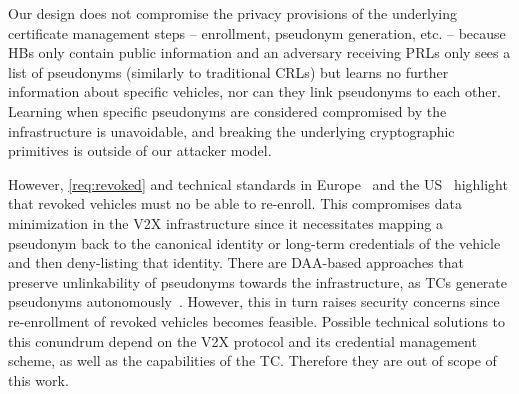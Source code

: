 Our design does not compromise the privacy provisions of the underlying
certificate management steps -- enrollment, pseudonym generation, etc. --
because \acp{HB} only contain public information and an adversary receiving
\acp{PRL} only sees a list of pseudonyms (similarly to traditional \acp{CRL})
but learns no further information about specific vehicles, nor can they link
pseudonyms to each other. Learning when specific pseudonyms are considered
compromised by the infrastructure is unavoidable, and breaking the underlying
cryptographic primitives is outside of our attacker model.

However, \cref{req:revoked} and technical standards in
Europe~\cite{etsi2022102941} and the US~\cite{brecht2018scms} highlight that
revoked vehicles must no be able to re-enroll. This compromises data
minimization in the V2X infrastructure since it necessitates mapping a pseudonym
back to the canonical identity or long-term credentials of the vehicle and then
deny-listing that identity.
%
There are DAA-based approaches that preserve unlinkability of pseudonyms towards
the infrastructure, as \acp{TC} generate pseudonyms
autonomously~\cite{whitefield2017privacy,desmoulins2019practical}. However, this
in turn raises security concerns since re-enrollment of revoked vehicles becomes
feasible. Possible technical solutions to this conundrum depend on the V2X
protocol and its credential management scheme, as well as the capabilities of
the TC. Therefore they are out of scope of this work.
